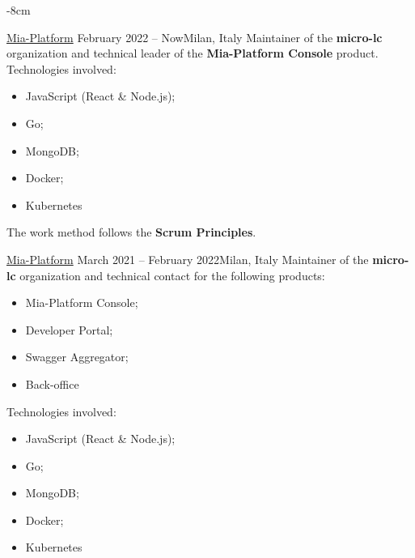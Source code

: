 \documentclass[10pt,a4paper]{altacv}
\begin{document}


\begin{adjustwidth}{}{-8cm}
\makecvheader
\end{adjustwidth}


{\href{https://mia-platform.eu/}{Mia-Platform}}
{February 2022 -- Now}{Milan, Italy}
Maintainer of the \textbf{micro-lc} organization and technical leader of the \textbf{Mia-Platform Console} product.
\newline\newline
Technologies involved:
\begin{itemize}
	\item JavaScript (React \& Node.js);
	\item Go;
	\item MongoDB;
	\item Docker;
	\item Kubernetes
\end{itemize}

The work method follows the \textbf{Scrum Principles}.
\divider

{\href{https://mia-platform.eu/}{Mia-Platform}}
{March 2021 -- February 2022}{Milan, Italy}
Maintainer of the \textbf{micro-lc} organization and technical contact for the following products:
\begin{itemize}
	\item Mia-Platform Console;
	\item Developer Portal;
	\item Swagger Aggregator;
	\item Back-office
\end{itemize}
\leavevmode \newline
Technologies involved:
\begin{itemize}
	\item JavaScript (React \& Node.js);
	\item Go;
	\item MongoDB;
	\item Docker;
	\item Kubernetes
\end{itemize}
\end{document}

